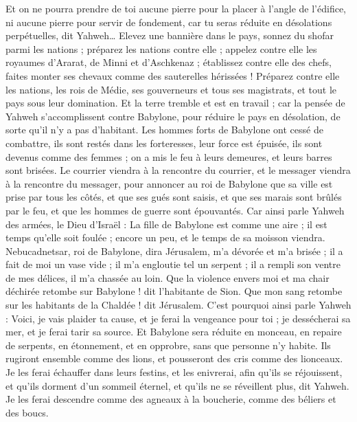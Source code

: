 \begin{multicols}{2}
Et on ne pourra prendre de toi aucune pierre pour la placer à l'angle de l'édifice, ni aucune pierre pour servir de fondement, car tu seras réduite en désolations perpétuelles, dit Yahweh…
Elevez une bannière dans le pays, sonnez du shofar parmi les nations ; préparez les nations contre elle ; appelez contre elle les royaumes d'Ararat, de Minni et d'Aschkenaz ; établissez contre elle des chefs, faites monter ses chevaux comme des sauterelles hérissées !
Préparez contre elle les nations, les rois de Médie, ses gouverneurs et tous ses magistrats, et tout le pays sous leur domination.
Et la terre tremble et est en travail ; car la pensée de Yahweh s'accomplissent contre Babylone, pour réduire le pays en désolation, de sorte qu’il n’y a pas d’habitant.
Les hommes forts de Babylone ont cessé de combattre, ils sont restés dans les forteresses, leur force est épuisée, ils sont devenus comme des femmes ; on a mis le feu à leurs demeures, et leurs barres sont brisées.
Le courrier viendra à la rencontre du courrier, et le messager viendra à la rencontre du messager, pour annoncer au roi de Babylone que sa ville est prise par tous les côtés,
et que ses gués sont saisis, et que ses marais sont brûlés par le feu, et que les hommes de guerre sont épouvantés.
Car ainsi parle Yahweh des armées, le Dieu d'Israël : La fille de Babylone est comme une aire ; il est temps qu'elle soit foulée ; encore un peu, et le temps de sa moisson viendra.
Nebucadnetsar, roi de Babylone, dira Jérusalem, m'a dévorée et m'a brisée ; il a fait de moi un vase vide ; il m'a engloutie tel un serpent ; il a rempli son ventre de mes délices, il m'a chassée au loin.
Que la violence envers moi et ma chair déchirée retombe sur Babylone ! dit l'habitante de Sion. Que mon sang retombe sur les habitants de la Chaldée ! dit Jérusalem.
C'est pourquoi ainsi parle Yahweh : Voici, je vais plaider ta cause, et je ferai la vengeance pour toi ; je dessécherai sa mer, et je ferai tarir sa source.
Et Babylone sera réduite en monceau, en repaire de serpents, en étonnement, et en opprobre, sans que personne n'y habite.
Ils rugiront ensemble comme des lions, et pousseront des cris comme des lionceaux.
Je les ferai échauffer dans leurs festins, et les enivrerai, afin qu'ils se réjouissent, et qu'ils dorment d'un sommeil éternel, et qu'ils ne se réveillent plus, dit Yahweh.
Je les ferai descendre comme des agneaux à la boucherie, comme des béliers et des boucs.

\end{multicols}
